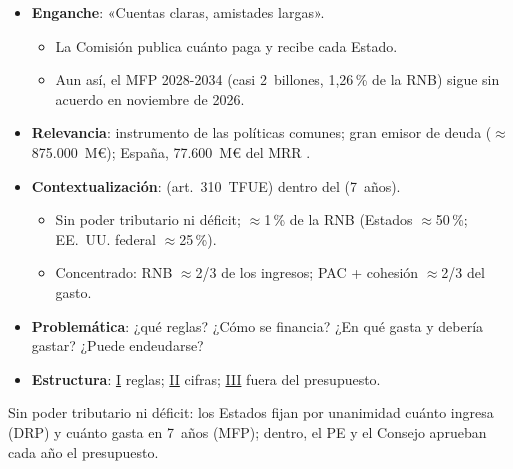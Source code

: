 \documentclass{article}
\begin{document}
\cabecerarepaso
\begin{columnas}

\begin{itemize}
\item \textbf{Enganche}: «Cuentas claras, amistades largas».
  \begin{itemize}
  \item La Comisión publica cuánto paga y recibe cada Estado.
  \item Aun así, el MFP 2028-2034 (casi 2~billones, 1,26\,\% de la RNB) sigue sin acuerdo en noviembre de 2026.
  \end{itemize}
\item \textbf{Relevancia}: instrumento de las políticas comunes; gran emisor de deuda ($\approx$875.000~M€); España, 77.600~M€ del MRR .
\item \textbf{Contextualización}:  (art.~310~TFUE) dentro del  (7~años).
  \begin{itemize}
  \item Sin poder tributario ni déficit; $\approx$1\,\% de la RNB (Estados $\approx$50\,\%; EE.~UU. federal $\approx$25\,\%).
  \item Concentrado: RNB $\approx$2/3 de los ingresos; PAC + cohesión $\approx$2/3 del gasto.
  \end{itemize}
\item \textbf{Problemática}: ¿qué reglas? ¿Cómo se financia? ¿En qué gasta y debería gastar? ¿Puede endeudarse?
\item \textbf{Estructura}: \hyperref[rep:I]{I} reglas; \hyperref[rep:II]{II} cifras; \hyperref[rep:III]{III} fuera del presupuesto.
\end{itemize}

\begin{ideaclave}
Sin poder tributario ni déficit: los Estados fijan por unanimidad cuánto ingresa (DRP) y cuánto gasta en 7~años (MFP); dentro, el PE y el Consejo aprueban cada año el presupuesto.
\end{ideaclave}


\end{columnas}
\end{document}
